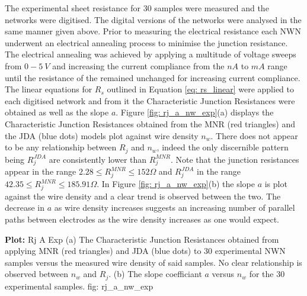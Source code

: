 The experimental sheet resistance for 30 samples were measured and the networks were digitised. The digital versions of the networks were analysed in the same manner given above. Prior to measuring the electrical resistance each NWN underwent an electrical annealing process to minimise the junction resistance. The electrical annealing was achieved by applying a multitude of voltage sweeps from $0-5~V$ and increasing the current compliance from the $nA$ to $mA$ range until the resistance of the remained unchanged for increasing current compliance\cite{rocha2015}. The linear equations for $R_s$ outlined in Equation \ref{eq: rs_linear} were applied to each digitised network and from it the Characteristic Junction Resistances were obtained as well as the slope $a$. Figure \ref{fig: rj_a_nw_exp}(a) displays the Characteristic Junction Resistances obtained from the MNR (red triangles) and the JDA (blue dots) models plot against wire density $n_w$. There does not appear to be any relationship between $R_j$ and $n_w$, indeed the only discernible pattern being $R^{JDA}_j$ are consistently lower than $R^{MNR}_j$. Note that the junction resistances appear in the range $2.28\leq R^{MNR}_j \leq 152 \Omega$ and $R^{JDA}_j$ in the range $42.35 \leq R^{MNR}_j \leq 185.91 \Omega$. In Figure \ref{fig: rj_a_nw_exp}(b) the slope $a$ is plot against the wire density and a clear trend is observed between the two. The decrease in $a$ as wire density increases suggests an increasing number of parallel paths between electrodes as the wire density increases as one would expect. 

{\textbf{Plot:} Rj A Exp}
{(a) The Characteristic Junction Resistances obtained from applying MNR (red triangles) and JDA (blue dots) to 30 experimental NWN samples versus the measured wire density of said samples. No clear relationship is observed between $n_w$ and $R_j$. (b) The slope coefficiant $a$ versus $n_w$ for the 30 experimental samples. }
{fig: rj_a_nw_exp}

